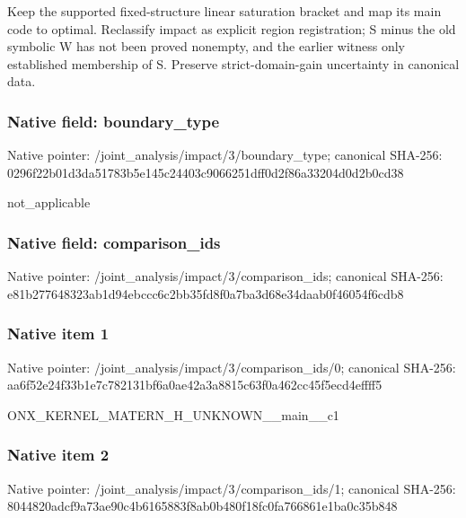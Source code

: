 \documentclass[10pt,a4paper]{article}
\begin{document}
\begingroup\raggedright\sloppy Keep the supported fixed-structure linear saturation bracket and map its main code to optimal. Reclassify impact as explicit region registration;\allowbreak{} S minus the old symbolic W has not been proved nonempty,\allowbreak{} and the earlier witness only established membership of S. Preserve strict-domain-gain uncertainty in canonical data.\par\endgroup

\subsubsection{Native field: boundary\_\allowbreak{}type}
Native pointer: /joint\_\allowbreak{}analysis/impact/3/boundary\_\allowbreak{}type; canonical SHA-256: 0296f22b01d3da51783b5e145c24403c9066251dff0d2f86a33204d0d2b0cd38

\begingroup\raggedright\sloppy not\_\allowbreak{}applicable\par\endgroup

\subsubsection{Native field: comparison\_\allowbreak{}ids}
Native pointer: /joint\_\allowbreak{}analysis/impact/3/comparison\_\allowbreak{}ids; canonical SHA-256: e81b277648323ab1d94ebccc6c2bb35fd8f0a7ba3d68e34daab0f46054f6cdb8

\subsubsection{Native item 1}
Native pointer: /joint\_\allowbreak{}analysis/impact/3/comparison\_\allowbreak{}ids/0; canonical SHA-256: aa6f52e24f33b1e7c782131bf6a0ae42a3a8815c63f0a462cc45f5ecd4effff5

\begingroup\raggedright\sloppy ONX\_\allowbreak{}KERNEL\_\allowbreak{}MATERN\_\allowbreak{}H\_\allowbreak{}UNKNOWN\_\allowbreak{}\_\allowbreak{}main\_\allowbreak{}\_\allowbreak{}c1\par\endgroup

\subsubsection{Native item 2}
Native pointer: /joint\_\allowbreak{}analysis/impact/3/comparison\_\allowbreak{}ids/1; canonical SHA-256: 8044820adcf9a73ae90c4b6165883f8ab0b480f18fc0fa766861e1ba0c35b848
\end{document}
